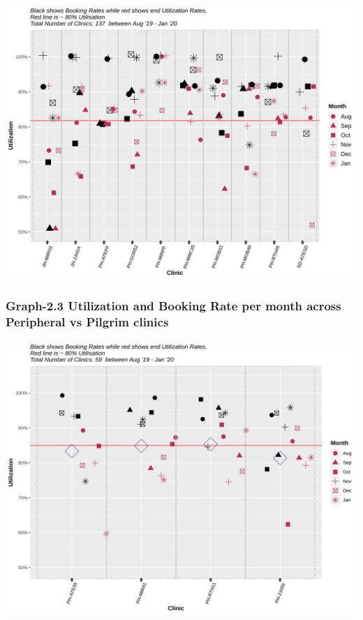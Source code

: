 \documentclass[]{article}
\begin{document}
\begin{center}\includegraphics{LF2_files/figure-latex/unnamed-chunk-6-1} \end{center}

\hypertarget{graph-2.3-utilization-and-booking-rate-per-month-across-peripheral-vs-pilgrim-clinics}{%
\subsubsection{Graph-2.3 Utilization and Booking Rate per month across
Peripheral vs Pilgrim
clinics}\label{graph-2.3-utilization-and-booking-rate-per-month-across-peripheral-vs-pilgrim-clinics}}

\begin{center}\includegraphics{LF2_files/figure-latex/unnamed-chunk-7-1} \end{center}
\end{document}
